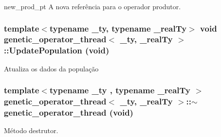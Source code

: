 new\_\-prod\_\-pt A nova referência para o operador produtor. \hypertarget{classgenetic__operator__thread_a44556f084005e19742891fae2e3c8df3}{
\subsubsection[{UpdatePopulation}]{\setlength{\rightskip}{0pt plus 5cm}template$<$typename \_\-ty, typename \_\-realTy$>$ void {\bf genetic\_\-operator\_\-thread}$<$ \_\-ty, \_\-realTy $>$::UpdatePopulation (void)}}
\label{classgenetic__operator__thread_a44556f084005e19742891fae2e3c8df3}
Atualiza os dados da população \hypertarget{classgenetic__operator__thread_a30c4b7a10dae2ff72905416953a64049}{
\subsubsection[{$\sim$genetic\_\-operator\_\-thread}]{\setlength{\rightskip}{0pt plus 5cm}template$<$typename \_\-ty , typename \_\-realTy $>$ {\bf genetic\_\-operator\_\-thread}$<$ \_\-ty, \_\-realTy $>$::$\sim${\bf genetic\_\-operator\_\-thread} (void)}}
\label{classgenetic__operator__thread_a30c4b7a10dae2ff72905416953a64049}
Método destrutor. 

